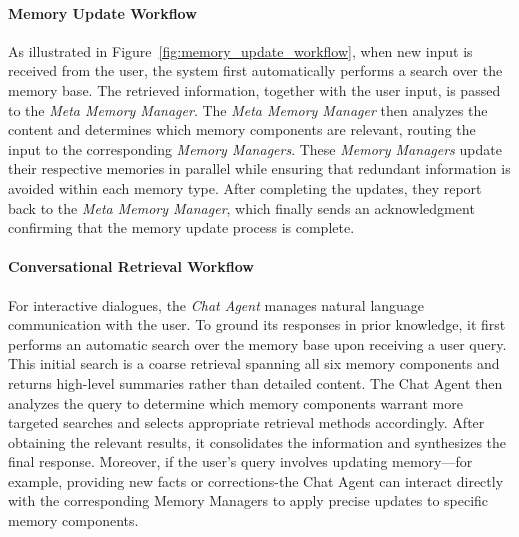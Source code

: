 \paragraph{Memory Update Workflow}
As illustrated in Figure~\ref{fig:memory_update_workflow}, when new input is received from the user, the system first automatically performs a search over the memory base. The retrieved information, together with the user input, is passed to the \emph{Meta Memory Manager}. The \emph{Meta Memory Manager} then analyzes the content and determines which memory components are relevant, routing the input to the corresponding \emph{Memory Managers}. These \emph{Memory Managers} update their respective memories in parallel while ensuring that redundant information is avoided within each memory type. After completing the updates, they report back to the \emph{Meta Memory Manager}, which finally sends an acknowledgment confirming that the memory update process is complete.

\paragraph{Conversational Retrieval Workflow}
For interactive dialogues, the \textit{Chat Agent} manages natural language communication with the user. To ground its responses in prior knowledge, it first performs an automatic search over the memory base upon receiving a user query. This initial search is a coarse retrieval spanning all six memory components and returns high-level summaries rather than detailed content. The Chat Agent then analyzes the query to determine which memory components warrant more targeted searches and selects appropriate retrieval methods accordingly. After obtaining the relevant results, it consolidates the information and synthesizes the final response. Moreover, if the user’s query involves updating memory—for example, providing new facts or corrections-the Chat Agent can interact directly with the corresponding Memory Managers to apply precise updates to specific memory components.
